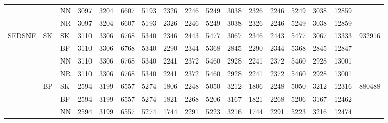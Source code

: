 \documentclass[../main/main.tex]{subfiles}
\begin{document}
\begin{table}
\begin{adjustbox}{max width=\textwidth}
\begin{threeparttable}
\begin{tabular}{cllcccccccccccccc}
                       &      & NN   &
                3097   & 3204 & 6607 & 5193 &
                2326   & 2246 & 5249 & 3038 &
                2326   & 2246 & 5249 & 3038 &
                12859  &
                \\
                       &      & NR   &
                3097   & 3204 & 6607 & 5193 &
                2326   & 2246 & 5249 & 3038 &
                2326   & 2246 & 5249 & 3038 &
                12859  &
                \\
                \midrule\midrule
                \multirow{16}[6]{*}{SEDSNF} & \multirow{4}{*}{SK}  & SK &
                3110                        & 3306   & 6768 & 5340 &
                2346                        & 2443   & 5477 & 3067 &
                2346                        & 2443   & 5477 & 3067 &
                13333                       & \multirow{4}{*}{932916}
                \\
                       &      & BP   &
                3110   & 3306 & 6768 & 5340 &
                2290   & 2344 & 5368 & 2845 &
                2290   & 2344 & 5368 & 2845 &
                12847  &
                \\
                       &      & NN   &
                3110   & 3306 & 6768 & 5340 &
                2241   & 2372 & 5460 & 2928 &
                2241   & 2372 & 5460 & 2928 &
                13001  &
                \\
                       &      & NR   &
                3110   & 3306 & 6768 & 5340 &
                2241   & 2372 & 5460 & 2928 &
                2241   & 2372 & 5460 & 2928 &
                13001  &
                \\ \cmidrule(lr){2-17}
                       & \multirow{4}{*}{BP}     & SK   &
                2594   & 3199                    & 6557 & 5274 &
                1806   & 2248                    & 5050 & 3212 &
                1806   & 2248                    & 5050 & 3212 &
                12316  & \multirow{4}{*}{880488}
                \\
                       &      & BP   &
                2594   & 3199 & 6557 & 5274 &
                1821   & 2268 & 5206 & 3167 &
                1821   & 2268 & 5206 & 3167 &
                12462  &
                \\
                       &      & NN   &
                2594   & 3199 & 6557 & 5274 &
                1744   & 2291 & 5223 & 3216 &
                1744   & 2291 & 5223 & 3216 &
                12474  &
                \\

\end{tabular}
\end{threeparttable}
\end{adjustbox}
\end{table}
\end{document}
